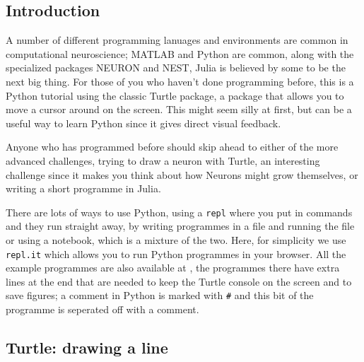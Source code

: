 \documentclass[11pt,a4paper]{scrartcl}
\begin{document}
\subsection*{Introduction}
A number of different programming lanuages and environments are common
in computational neuroscience; MATLAB and Python are common, along
with the specialized packages NEURON and NEST, Julia is believed by
some to be the next big thing. For those of you who haven't done
programming before, this is a Python tutorial using the classic Turtle
package, a package that allows you to move a cursor around on the
screen. This might seem silly at first, but can be a useful way to
learn Python since it gives direct visual feedback.

Anyone who has programmed before should skip ahead to either of the
more advanced challenges, trying to draw a neuron with Turtle, an
interesting challenge since it makes you think about how Neurons might
grow themselves, or writing a short programme in Julia.

There are lots of ways to use Python, using a \texttt{repl} where you
put in commands and they run straight away, by writing programmes in a
file and running the file or using a notebook, which is a mixture of
the two. Here, for simplicity we use \texttt{repl.it} which allows you
to run Python programmes in your browser. All the example programmes
are also available at \texttt{}, the programmes there have extra lines
at the end that are needed to keep the Turtle console on the screen
and to save figures; a comment in Python is marked with \texttt{\#}
and this bit of the programme is seperated off with a comment.

\subsection*{Turtle: drawing a line}
\end{document}
